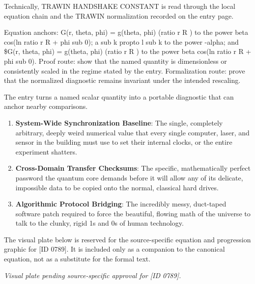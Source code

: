 Technically, TRAWIN HANDSHAKE CONSTANT is read through the local equation chain and the TRAWIN normalization recorded on the entry page.

Equation anchors: G(r, theta, phi) = g(theta, phi) (ratio r R ) to the power beta cos(ln ratio r R + phi sub 0); a sub k propto l sub k to the power -alpha; and \$G(r, theta, phi) = g(theta, phi) (ratio r R ) to the power beta cos(ln ratio r R + phi sub 0). Proof route: show that the named quantity is dimensionless or consistently scaled in the regime stated by the entry. Formalization route: prove that the normalized diagnostic remains invariant under the intended rescaling.

The entry turns a named scalar quantity into a portable diagnostic that can anchor nearby comparisons.
\endgroup

\begin{enumerate}[leftmargin=1.6em,itemsep=6pt,topsep=4pt]
\item \textbf{System-Wide Synchronization Baseline}: The single, completely arbitrary, deeply weird numerical value that every single computer, laser, and sensor in the building must use to set their internal clocks, or the entire experiment shatters.
\item \textbf{Cross-Domain Transfer Checksums}: The specific, mathematically perfect password the quantum core demands before it will allow any of its delicate, impossible data to be copied onto the normal, classical hard drives.
\item \textbf{Algorithmic Protocol Bridging}: The incredibly messy, duct-taped software patch required to force the beautiful, flowing math of the universe to talk to the clunky, rigid 1s and 0s of human technology.
\end{enumerate}

\begingroup\footnotesize\sloppy
The visual plate below is reserved for the source-specific equation and progression graphic for [ID 0789]. It is included only as a companion to the canonical equation, not as a substitute for the formal text.
\par\endgroup
\begingroup\footnotesize\itshape
Visual plate pending source-specific approval for [ID 0789].
\par\endgroup

